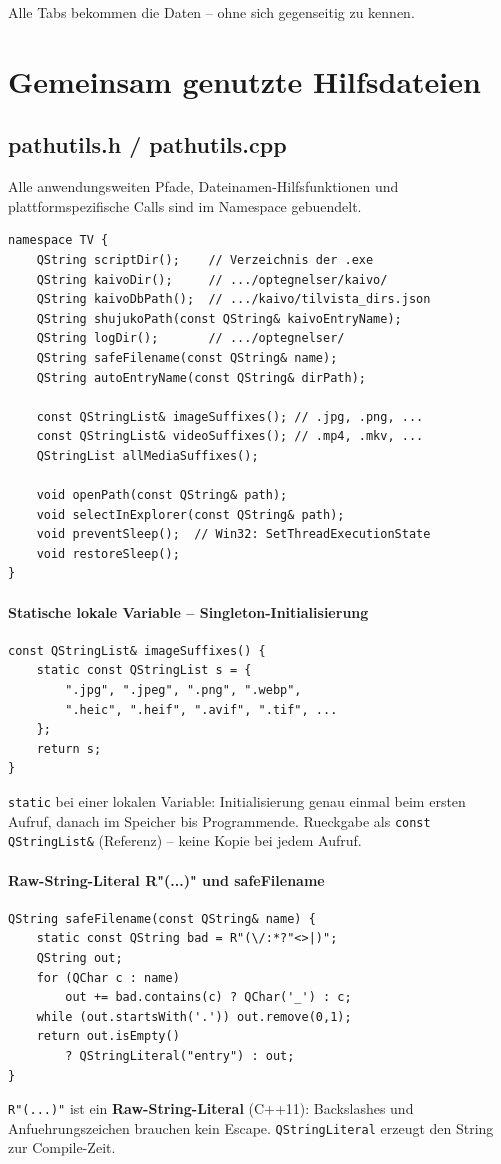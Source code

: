 Alle Tabs bekommen die Daten -- ohne sich gegenseitig
zu kennen.

\section{Gemeinsam genutzte Hilfsdateien}

\subsection{pathutils.h / pathutils.cpp}

Alle anwendungsweiten Pfade, Dateinamen-Hilfsfunktionen
und plattformspezifische Calls sind im Namespace 
gebuendelt.

\begin{lstlisting}[style=header, caption={pathutils.h}]
namespace TV {
    QString scriptDir();    // Verzeichnis der .exe
    QString kaivoDir();     // .../optegnelser/kaivo/
    QString kaivoDbPath();  // .../kaivo/tilvista_dirs.json
    QString shujukoPath(const QString& kaivoEntryName);
    QString logDir();       // .../optegnelser/
    QString safeFilename(const QString& name);
    QString autoEntryName(const QString& dirPath);

    const QStringList& imageSuffixes(); // .jpg, .png, ...
    const QStringList& videoSuffixes(); // .mp4, .mkv, ...
    QStringList allMediaSuffixes();

    void openPath(const QString& path);
    void selectInExplorer(const QString& path);
    void preventSleep();  // Win32: SetThreadExecutionState
    void restoreSleep();
}
\end{lstlisting}

\paragraph{Statische lokale Variable -- Singleton-Initialisierung}
\begin{lstlisting}
const QStringList& imageSuffixes() {
    static const QStringList s = {
        ".jpg", ".jpeg", ".png", ".webp",
        ".heic", ".heif", ".avif", ".tif", ...
    };
    return s;
}
\end{lstlisting}
\verb|static| bei einer lokalen Variable: Initialisierung
genau einmal beim ersten Aufruf, danach im Speicher bis
Programmende. Rueckgabe als \verb|const QStringList&|
(Referenz) -- keine Kopie bei jedem Aufruf.

\paragraph{Raw-String-Literal R"(...)" und safeFilename}
\begin{lstlisting}
QString safeFilename(const QString& name) {
    static const QString bad = R"(\/:*?"<>|)";
    QString out;
    for (QChar c : name)
        out += bad.contains(c) ? QChar('_') : c;
    while (out.startsWith('.')) out.remove(0,1);
    return out.isEmpty()
        ? QStringLiteral("entry") : out;
}
\end{lstlisting}
\verb|R"(...)"| ist ein \textbf{Raw-String-Literal} (C++11):
Backslashes und Anfuehrungszeichen brauchen kein Escape.
\verb|QStringLiteral| erzeugt den String zur Compile-Zeit.

